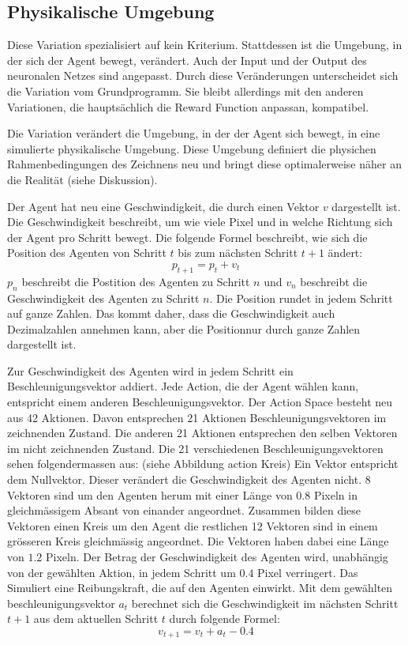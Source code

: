 \subsection{Physikalische Umgebung}
\label{sub:m_var_phy}

Diese Variation spezialisiert auf kein Kriterium. Stattdessen ist die Umgebung,
in der sich der Agent bewegt, verändert. Auch der Input und der Output des
neuronalen Netzes sind angepasst. Durch diese Veränderungen unterscheidet sich die
Variation vom Grundprogramm. Sie bleibt allerdings mit den anderen
Variationen, die hauptsächlich die Reward Function anpassan, kompatibel.

Die Variation verändert die Umgebung, in der der Agent sich bewegt, in eine
simulierte physikalische Umgebung. Diese Umgebung definiert die physichen
Rahmenbedingungen des Zeichnens neu und bringt diese optimalerweise näher an die
Realität (siehe Diskussion). 

Der Agent hat neu eine Geschwindigkeit, die durch einen Vektor $v$ dargestellt
ist. Die Geschwindigkeit beschreibt, um wie viele Pixel und in welche Richtung
sich der Agent pro Schritt bewegt.
Die folgende Formel beschreibt, wie sich die Position des Agenten von Schritt
$t$ bis zum nächsten Schritt $t+1$ ändert:
$$p_{t+1} = p_t + v_t$$
$p_n$ beschreibt die Postition des Agenten zu Schritt $n$ und $v_n$ beschreibt
die Geschwindigkeit des Agenten zu Schritt $n$. Die Position rundet in jedem
Schritt auf ganze Zahlen. Das kommt daher, dass die Geschwindigkeit auch
Dezimalzahlen annehmen kann, aber die Positionnur durch ganze Zahlen dargestellt
ist.

Zur Geschwindigkeit des Agenten wird in jedem Schritt ein Beschleunigungsvektor
addiert. Jede Action, die der Agent wählen kann, entspricht einem anderen
Beschleunigungsvektor. Der Action Space besteht neu aus 42 Aktionen. Davon
entsprechen 21 Aktionen Beschleunigungsvektoren im zeichnenden Zustand. Die
anderen 21 Aktionen entsprechen den selben Vektoren im nicht zeichnenden
Zustand. Die 21 verschiedenen Beschleunigungsvektoren sehen folgendermassen aus:
(siehe Abbildung action Kreis) Ein Vektor entspricht dem Nullvektor. Dieser
verändert die Geschwindigkeit des Agenten nicht. $8$ Vektoren sind um den
Agenten herum mit einer Länge von $0.8$ Pixeln in gleichmässigem Absant von
einander angeordnet. Zusammen bilden diese Vektoren einen Kreis um den Agent die
restlichen 12 Vektoren sind in einem grösseren Kreis gleichmässig angeordnet.
Die Vektoren haben dabei eine Länge von $1.2$ Pixeln. Der Betrag der
Geschwindigkeit des Agenten wird, unabhängig von der gewählten Aktion, in jedem
Schritt um $0.4$ Pixel verringert. Das Simuliert eine Reibungskraft, die auf den
Agenten einwirkt.
Mit dem gewählten beschleunigungsvektor $a_t$ berechnet sich die Geschwindigkeit
im nächsten Schritt $t+1$ aus dem aktuellen Schritt $t$ durch folgende Formel:
$$v_{t+1} = v_t + a_t - 0.4$$

